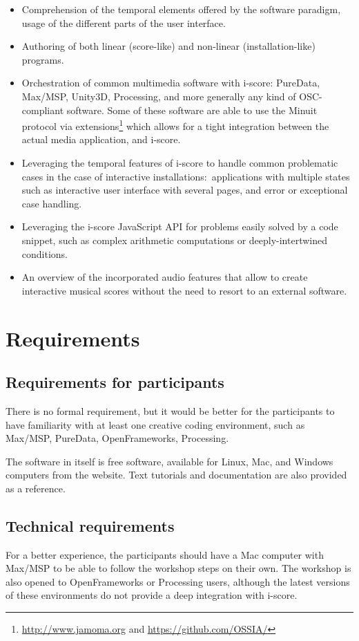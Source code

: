 \documentclass[11pt]{article}
\begin{document}
\begin{itemize}
	\item Comprehension of the temporal elements offered by the software paradigm, usage of the different parts of the user interface.
	\item Authoring of both linear (score-like) and non-linear (installation-like) programs.
	\item Orchestration of common multimedia software with i-score: PureData, Max/MSP, Unity3D, Processing, and more generally any kind of OSC-compliant software.
	Some of these software are able to use the Minuit protocol via extensions\footnote{\url{http://www.jamoma.org} and \url{https://github.com/OSSIA/}} which allows for a tight integration between the actual media application, and i-score.
	\item Leveraging the temporal features of i-score to handle common problematic cases in the case of interactive installations:~applications with multiple states such as interactive user interface with several pages, and error or exceptional case handling.
	\item Leveraging the i-score JavaScript API for problems easily solved by a code snippet, such as complex arithmetic computations or deeply-intertwined conditions.
	\item An overview of the incorporated audio features that allow to create interactive musical scores without the need to resort to an external software.
\end{itemize}

\section*{Requirements}
\subsection*{Requirements for participants}
There is no formal requirement, but it would be better for the
participants to have familiarity with at least one creative coding environment,
such as Max/MSP, PureData, OpenFrameworks, Processing.

The software in itself is free software, available for Linux, Mac, and Windows computers from the website.
Text tutorials and documentation are also provided as a reference.\subsection*{Technical requirements}
For a better experience, the participants should have a Mac computer with Max/MSP to be able to follow the workshop steps on their own. The workshop is also opened to OpenFrameworks or Processing users, although the latest versions of these environments do not provide a deep integration with i-score.
\end{document}
